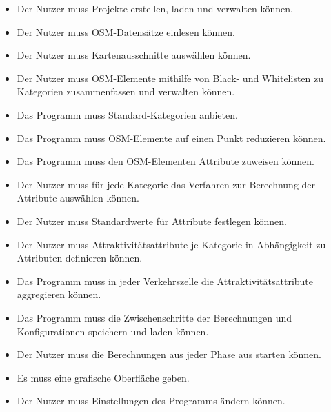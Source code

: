 \documentclass[parskip=full]{scrartcl} %
\begin{document}
\begin{itemize}
    \item <MK1> Der Nutzer muss Projekte erstellen, laden und verwalten können.
    \item <MK2> Der Nutzer muss OSM-Datensätze einlesen können.
    \item <MK3> Der Nutzer muss Kartenausschnitte auswählen können.
    \item <MK4> Der Nutzer muss OSM-Elemente mithilfe von Black- und Whitelisten zu Kategorien zusammenfassen und verwalten können.
    \item <MK5> Das Programm muss Standard-Kategorien anbieten.
    \item <MK6> Das Programm muss OSM-Elemente auf einen Punkt reduzieren können.
    \item <MK7> Das Programm muss den OSM-Elementen Attribute zuweisen können.
    \item <MK8> Der Nutzer muss für jede Kategorie das Verfahren zur Berechnung der Attribute auswählen können.
    \item <MK9> Der Nutzer muss Standardwerte für Attribute festlegen können.
    \item <MK10> Der Nutzer muss Attraktivitätsattribute je Kategorie in Abhängigkeit zu Attributen definieren können.
    \item <MK11> Das Programm muss in jeder Verkehrszelle die Attraktivitätsattribute aggregieren können.
    \item <MK12> Das Programm muss die Zwischenschritte der Berechnungen und Konfigurationen speichern und laden können.
    \item <MK13> Der Nutzer muss die Berechnungen aus jeder Phase aus starten können.
    \item <MK14> Es muss eine grafische Oberfläche geben.
    \item <MK15> Der Nutzer muss Einstellungen des Programms ändern können.
\end{itemize}
\end{document}

